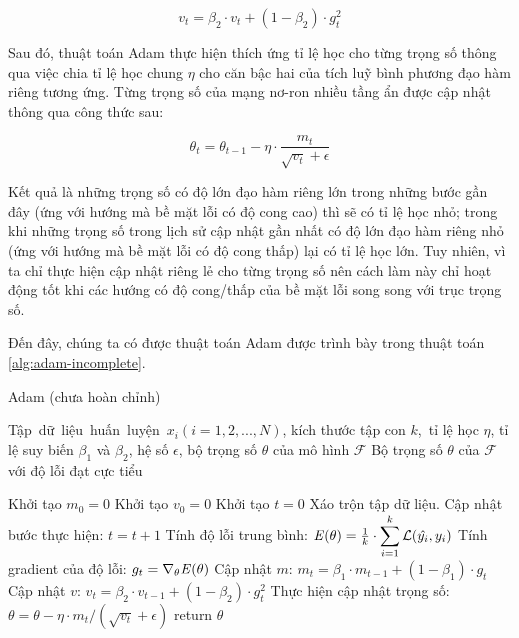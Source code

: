 \begin{equation} \label{eqn:adam-v}
	v_t = \beta_2 \cdot v_t + (1 - \beta_2) \cdot g_t^2
\end{equation}

Sau đó, thuật toán Adam thực hiện thích ứng tỉ lệ học cho từng trọng số thông qua việc chia tỉ lệ học chung $\eta$ cho căn bậc hai của tích luỹ bình phương đạo hàm riêng tương ứng. Từng trọng số của mạng nơ-ron nhiều tầng ẩn được cập nhật thông qua công thức sau:

\begin{equation} \label{eqn:adam-step}
	\theta_t = \theta_{t-1} - \eta\cdot\frac{m_t}{\sqrt{v_t} + \epsilon}
\end{equation}

Kết quả là những trọng số có độ lớn đạo hàm riêng lớn trong những bước gần đây (ứng với hướng mà bề mặt lỗi có độ cong cao) thì sẽ có tỉ lệ học nhỏ; trong khi những trọng số trong lịch sử cập nhật gần nhất có độ lớn đạo hàm riêng nhỏ (ứng với hướng mà bề mặt lỗi có độ cong thấp) lại có tỉ lệ học lớn. Tuy nhiên, vì ta chỉ thực hiện cập nhật riêng lẻ cho từng trọng số nên cách làm này chỉ hoạt động tốt khi các hướng có độ cong/thấp của bề mặt lỗi song song với trục trọng số.

Đến đây, chúng ta có được thuật toán Adam được trình bày trong thuật toán \ref{alg:adam-incomplete}.

\begin{algorithm}
	\caption{Adam (chưa hoàn chỉnh)} \label{alg:adam-incomplete}
	\begin{algorithmic}[1]
		\renewcommand{\algorithmicrequire}{\textbf{Đầu vào:}}
		\renewcommand{\algorithmicensure}{\textbf{Đầu ra:}}
		\algnewcommand{}
		\algnewcommand\Operation{\item[\algorithmicoperation]}

		\Require Tập dữ liệu huấn luyện $x_i (i = 1, 2, ..., N)$, kích thước tập con $k$, tỉ lệ học $\eta$, tỉ lệ suy biến $\beta_1$ và $\beta_2$, hệ số $\epsilon$, bộ trọng số $\theta$ của mô hình $\mathcal{F}$
		\Ensure Bộ trọng số $\theta$ của $\mathcal{F}$ với độ lỗi đạt cực tiểu

		\Operation
		\State Khởi tạo $m_0=0$
		\State Khởi tạo $v_0=0$
		\State Khởi tạo $t=0$
			\State Xáo trộn tập dữ liệu.
				\State Cập nhật bước thực hiện: $t=t+1$
				\State Tính độ lỗi trung bình: $\mathbf{\it{E}(\theta)} = \frac{1}{k}\cdot \displaystyle\sum_{i=1}^{k}\mathcal{L}(\hat{y_i}, y_i)$
				\State Tính gradient của độ lỗi: $g_t =\nabla_{\theta} \mathbf{\it{E}(\theta)}$
				\State Cập nhật $m$: $m_t = \beta_1\cdot m_{t-1} + (1-\beta_1)\cdot g_t$
				\State Cập nhật $v$: $v_t = \beta_2\cdot v_{t-1} + (1-\beta_2)\cdot g^{2}_{t}$
				\State Thực hiện cập nhật trọng số: $\theta = \theta - \eta\cdot m_t/(\sqrt{v_t} + \epsilon)$
			\EndFor
		\EndWhile
		\State return $\theta$
	\end{algorithmic}
\end{algorithm}

